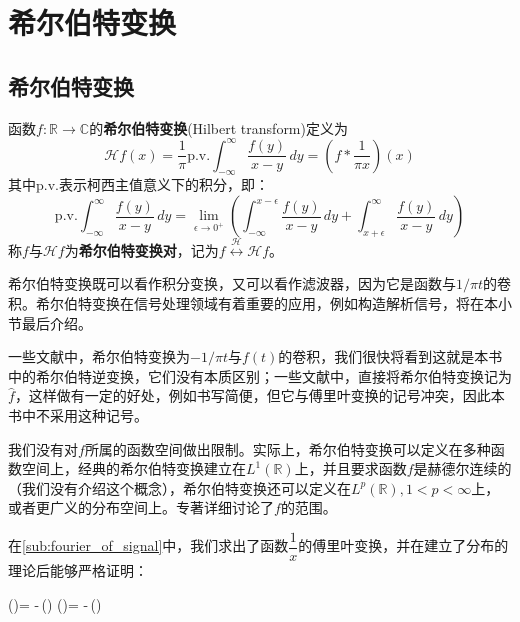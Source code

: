\documentclass{ctexbook}
\begin{document}
\section{希尔伯特变换}\label{sec:Hilbert}

\subsection{希尔伯特变换}\label{sub:hilbert}

\begin{definition}[希尔伯特变换]
    函数$f:\mathbb{R}\to\mathbb{C}$的\textbf{希尔伯特变换}(Hilbert transform)定义为
    \[\mathcal{H} f(x)=\frac{1}{\pi}\text{p.v.}\int_{-\infty}^{\infty}\frac{f(y)}{x-y}\,dy=\left(f*\frac{1}{\pi x}\right)(x)\]
    其中p.v.表示柯西主值意义下的积分\cite{hilbert_transform}，即：
    \[\text{p.v.}\int_{-\infty}^{\infty}\frac{f(y)}{x-y}\,dy=\lim_{\epsilon\to 0^+}\left(\int_{-\infty}^{x-\epsilon}\frac{f(y)}{x-y}\,dy+\int_{x+\epsilon}^{\infty}\frac{f(y)}{x-y}\,dy\right)\]
    称$f$与$\mathcal{H} f$为\textbf{希尔伯特变换对}，记为$f\overset{\mathcal{H} }{\longleftrightarrow} \mathcal{H} f$。
\end{definition}

希尔伯特变换既可以看作积分变换，又可以看作滤波器，因为它是函数与$1/\pi t$的卷积。希尔伯特变换在信号处理领域有着重要的应用，例如构造解析信号，将在本小节最后介绍。

\begin{remark}
    一些文献中\cite{brad_osgood_ee261}，希尔伯特变换为$-1/\pi t$与$f(t)$的卷积，我们很快将看到这就是本书中的希尔伯特逆变换，它们没有本质区别；一些文献中\cite{signal_systems}，直接将希尔伯特变换记为$\hat{f}$，这样做有一定的好处，例如书写简便，但它与傅里叶变换的记号冲突，因此本书中不采用这种记号。
\end{remark}
\begin{remark}
    我们没有对$f$所属的函数空间做出限制。实际上，希尔伯特变换可以定义在多种函数空间上，经典的希尔伯特变换建立在$L^1(\mathbb{R})$上，并且要求函数$f$是赫德尔连续的（我们没有介绍这个概念），希尔伯特变换还可以定义在$L^p(\mathbb{R}),1<p<\infty$上，或者更广义的分布空间上。专著\cite{hilbert_transform}详细讨论了$f$的范围。
\end{remark}

在\ref{sub:fourier_of_signal}中，我们求出了函数$\dfrac{1}{x}$的傅里叶变换，并在建立了分布的理论后能够严格证明：
\begin{lralign}
     (\xi)= -\,(\xi)
    \switch
     (\omega)= -\,(\omega)
\end{lralign}
\end{document}
